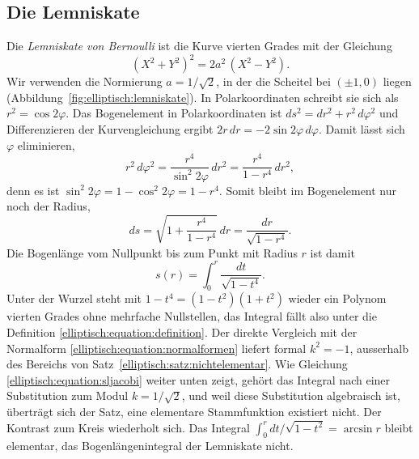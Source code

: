 \subsection{Die Lemniskate
\label{elliptisch:subsection:lemniskate}}
%
Die \emph{Lemniskate von Bernoulli} ist die Kurve vierten Grades
mit der Gleichung
\begin{equation}
(X^2+Y^2)^2 = 2a^2\,(X^2-Y^2).
\label{elliptisch:equation:lemniskate}
\end{equation}
Wir verwenden die Normierung $a = 1/\sqrt{2}$, in der die Scheitel
bei $(\pm 1, 0)$ liegen (Abbildung~\ref{fig:elliptisch:lemniskate}).
%
In Polarkoordinaten schreibt sie sich als $r^2 = \cos 2\varphi$.
Das Bogenelement in Polarkoordinaten ist
$ds^2 = dr^2 + r^2\,d\varphi^2$ und Differenzieren der
Kurvengleichung ergibt $2r\,dr = -2\sin 2\varphi\,d\varphi$.
Damit lässt sich $\varphi$ eliminieren,
\begin{equation}
r^2\,d\varphi^2
=
\frac{r^4}{\sin^2 2\varphi}\,dr^2
=
\frac{r^4}{1-r^4}\,dr^2,
\label{elliptisch:equation:phielimination}
\end{equation}
denn es ist $\sin^2 2\varphi = 1 - \cos^2 2\varphi = 1 - r^4$.
Somit bleibt im Bogenelement nur noch der Radius,
\begin{equation}
ds
=
\sqrt{1 + \frac{r^4}{1-r^4}}\,dr
=
\frac{dr}{\sqrt{1-r^4}}.
\label{elliptisch:equation:bogenelementr}
\end{equation}
Die Bogenlänge vom Nullpunkt bis zum Punkt mit Radius $r$ ist damit
\begin{equation}
s(r)
=
\int_0^r \frac{dt}{\sqrt{1-t^4}}.
\label{elliptisch:equation:lemniskatebogen}
\end{equation}
Unter der Wurzel steht mit $1-t^4 = (1-t^2)(1+t^2)$ wieder ein
Polynom vierten Grades ohne mehrfache Nullstellen, das Integral
fällt also unter die Definition
\eqref{elliptisch:equation:definition}.
Der direkte Vergleich mit der Normalform
\eqref{elliptisch:equation:normalformen} liefert formal
$k^2 = -1$, ausserhalb des Bereichs von
Satz~\ref{elliptisch:satz:nichtelementar}.
Wie Gleichung \eqref{elliptisch:equation:sljacobi} weiter unten
zeigt, gehört das Integral nach einer Substitution zum Modul
$k = 1/\sqrt{2}$, und weil diese Substitution algebraisch ist,
überträgt sich der Satz, eine elementare Stammfunktion existiert
nicht.
Der Kontrast zum Kreis wiederholt sich.
Das Integral $\int_0^r dt/\sqrt{1-t^2} = \arcsin r$ bleibt
elementar, das Bogenlängenintegral der Lemniskate nicht.

